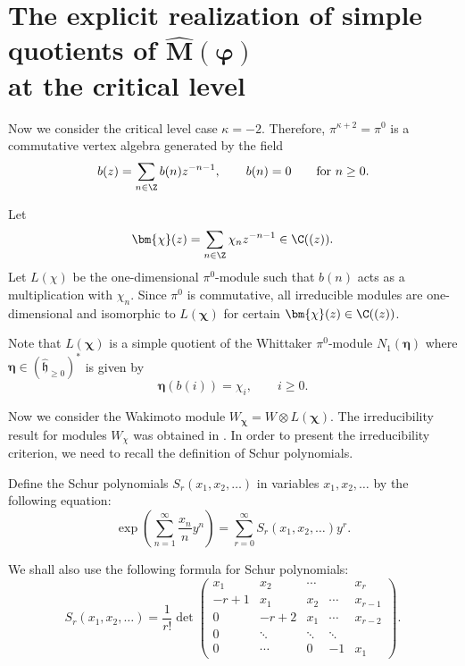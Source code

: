 \documentclass[pdftex]{sigma}
\numberwithin{equation}{section}
\theoremstyle{definition}
\newcommand{\1}{\textbf{1}}
\begin{document}
\section[The explicit realization of simple quotients of widehat M(varphi) at the critical level]{The explicit realization of simple quotients of $\boldsymbol{\widehat M(\varphi)}$\\ at the critical level}
\label{ired-critical-sl(2)}

Now we consider the critical level case $\kappa =-2$. Therefore, $\pi^{\kappa +2} = \pi^0 $ is a commutative vertex algebra generated by the field
 \[ b(z) = \sum_{n \in {\Z}} b(n) z^{-n-1}, \qquad b(n)=0 \qquad \mbox{for} \ n \ge 0. \]

Let \[ \bm{\chi}(z) = \sum_{n \in {\Z} } \chi_n z^{-n-1} \in {\C}((z)). \]
Let $L (\chi) $ be the one-dimensional $\pi^0$-module such that $b(n)$ acts as a multiplication with $\chi_n$. Since $\pi^0$ is commutative, all irreducible modules are one-dimensional and isomorphic to $L (\bm{\chi}) $ for certain $\bm{\chi}(z) \in {\C}((z))$.

Note that $L (\bm{\chi})$ is a simple quotient of the Whittaker $\pi^0$-module $N_1(\bm{\eta})$ where
$\bm{\eta} \in (\widehat{\mathfrak h}_{\ge 0}) ^* $ is given by
 \[ \bm{\eta}(b (i)) = \chi_i, \qquad i \ge 0. \]

Now we consider the Wakimoto module
$W_{\bm{\chi}} = W \otimes L (\bm{\chi})$.
The irreducibility result for modules $W_{\chi}$ was obtained in \cite{A-07, A-14}.
In order to present the irreducibility criterion, we need to
recall the definition of Schur polynomials.

 Define the Schur polynomials $S_{r}(x_{1},x_{2},\dots)$
 in variables $x_{1},x_{2},\dots$ by the following equation:
\begin{equation*}%
\exp\left(\sum_{n=1}^{\infty}\frac{x_n}{n}y^n\right)
=\sum_{r=0}^{\infty}S_r(x_1,x_2,\dots)y^r.
\end{equation*}

We shall also use the following formula for Schur polynomials:
\begin{equation*}%
S_r(x_1,x_2,\dots)=\frac{1}{r!}
\det\begin{pmatrix}
 x_1 & x_2 & \cdots & & x_r \\
 -r+1 & x_1 & x_2 & \cdots & x_{r-1} \\
 0 & -r+2 & x_1 & \cdots & x_{r-2} \\
 0 & \ddots & \ddots & \ddots & \\
 0 & \cdots & 0 & -1 & x_1
\end{pmatrix}.
\end{equation*}
\end{document}
